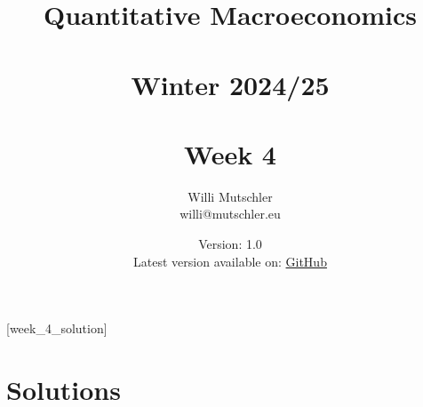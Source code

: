 
\newif\ifDisplaySolutions\DisplaySolutionstrue%


\title{Quantitative Macroeconomics\\~\\Winter 2024/25\\~\\Week 4}
\author{Willi Mutschler\\willi@mutschler.eu}
\date{Version: 1.0\\Latest version available on: \href{https://github.com/wmutschl/Quantitative-Macroeconomics/releases/latest/download/week_4.pdf}{GitHub}}
\maketitle\thispagestyle{empty}

\newpage
{}[week_4_solution]
\tableofcontents\thispagestyle{empty}\newpage

\setcounter{page}{1}
\newpage
\newpage
\newpage
\printbibliography%
\newpage

\ifDisplaySolutions%
\newpage
\appendix
\section{Solutions}

\fi
